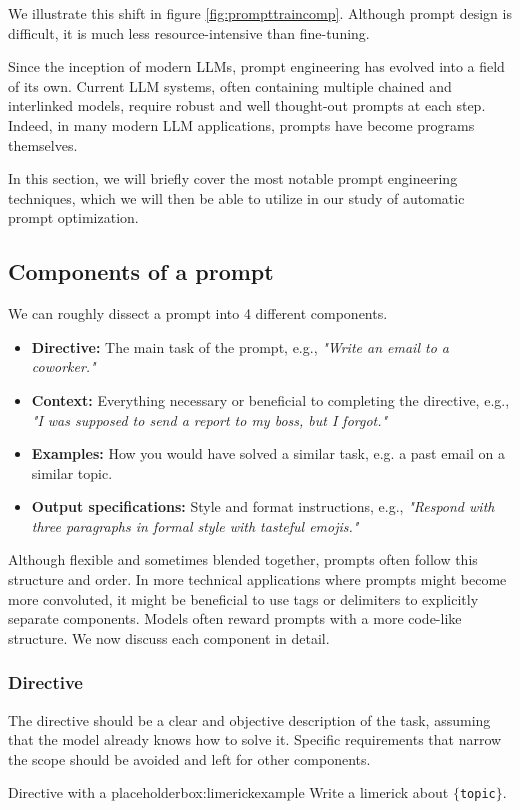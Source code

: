 We illustrate this shift in figure \ref{fig:prompttraincomp}. Although prompt design is difficult, it is much less resource-intensive than fine-tuning.

Since the inception of modern LLMs, prompt engineering has evolved into a field of its own. Current LLM systems, often containing
multiple chained and interlinked models, require robust and well thought-out prompts at each step. 
Indeed, in many modern LLM applications, prompts have become programs themselves\cite{schnabel2024symbolicpromptprogramsearch}.

In this section, we will briefly cover the most notable prompt engineering techniques, which we will then
be able to utilize in our study of automatic prompt optimization.
\subsection{Components of a prompt}
We can roughly dissect a prompt into 4 different components\cite{schulhoff2024promptreportsystematicsurvey}. 
\begin{itemize}
    \item \textbf{Directive:} The main task of the prompt, e.g., \textit{"Write an email to a coworker."}
    \item \textbf{Context:} Everything necessary or beneficial to completing the directive, e.g., \textit{"I was supposed to send a report to my boss, but I forgot."}
    \item \textbf{Examples:} How you would have solved a similar task, e.g. a past email on a similar topic.
    \item \textbf{Output specifications:} Style and format instructions, e.g., \textit{"Respond with three paragraphs in formal style with tasteful emojis."}
\end{itemize}

Although flexible and sometimes blended together, prompts often follow this structure and order. 
In more technical applications where prompts might become more convoluted, it might be beneficial to use tags or delimiters to explicitly separate components.
Models often reward prompts with a more code-like structure\cite{10.1145/3544548.3581388}. We now discuss each component in detail.

\subsubsection{Directive}
The directive should be a clear and objective description of the task, assuming that the model
already knows how to solve it\cite{reynolds2021promptprogramminglargelanguage}. 
Specific requirements that narrow the scope should be avoided and left for other components.
\begin{figurebox}{Directive with a placeholder}{box:limerickexample}
    Write a limerick about \texttt{$\{$topic$\}$}.
\end{figurebox}

